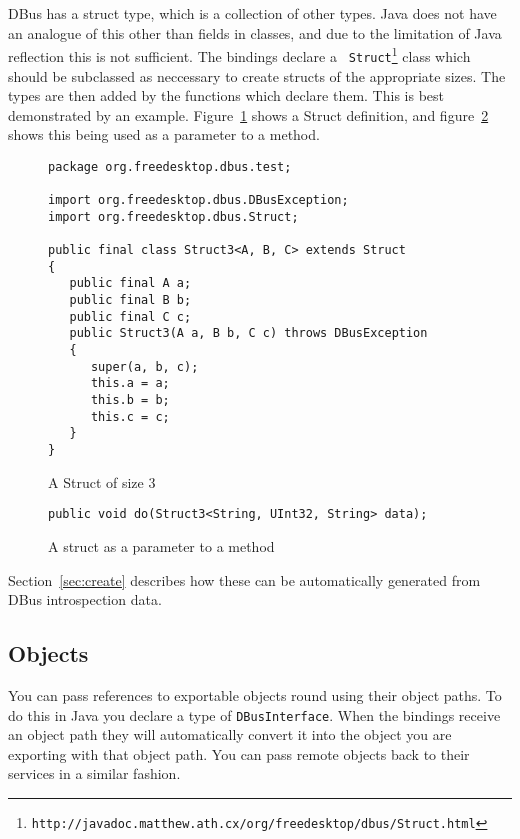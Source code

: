 \documentclass[a4paper,12pt]{article}
\begin{document}
DBus has a struct type, which is a collection of other types. Java
does not have an analogue of this other than fields in classes, and
due to the limitation of Java reflection this is not sufficient. The
bindings declare a {\tt
Struct\footnote{http://javadoc.matthew.ath.cx/org/freedesktop/dbus/Struct.html}} class
which should be subclassed as neccessary to create structs of the
appropriate sizes. The types are then added by the functions which
declare them. This is best demonstrated by an example.
Figure~\ref{fig:struct} shows a Struct definition, and
figure~\ref{fig:structmethod} shows this being used as a parameter
to a method.

\begin{figure}[htb]
\begin{center}
\begin{verbatim}
package org.freedesktop.dbus.test;

import org.freedesktop.dbus.DBusException;
import org.freedesktop.dbus.Struct;

public final class Struct3<A, B, C> extends Struct
{
   public final A a;
   public final B b;
   public final C c;
   public Struct3(A a, B b, C c) throws DBusException
   {
      super(a, b, c);
      this.a = a;
      this.b = b;
      this.c = c;
   }
}
\end{verbatim}
\end{center}
\caption{A Struct of size 3}
\label{fig:struct}
\end{figure}

\begin{figure}[htb]
\begin{center}
\begin{verbatim}
public void do(Struct3<String, UInt32, String> data);
\end{verbatim}
\end{center}
\caption{A struct as a parameter to a method}
\label{fig:structmethod}
\end{figure}


Section~\ref{sec:create} describes how these can be automatically
generated from DBus introspection data.

\subsection{Objects}

You can pass references to exportable objects round using their object paths.
To do this in Java you declare a type of {\tt DBusInterface}. When the bindings
receive an object path they will automatically convert it into the object you
are exporting with that object path. You can pass remote objects back to their
services in a similar fashion.
\end{document}
